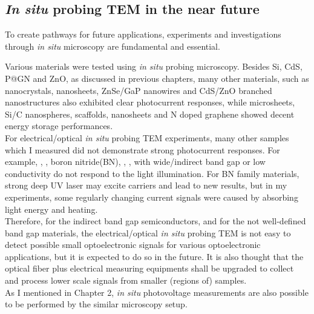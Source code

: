 
\subsection{\textit{In situ} probing TEM in the near future}
To create pathways for future applications, experiments and investigations through \textit{in situ} microscopy are fundamental and essential. 

Various materials were tested using \textit{in situ} probing microscopy. Besides Si, CdS, P@GN and ZnO, as discussed in previous chapters, many other materials, such as  nanocrystals,  nanosheets, ZnSe/GaP nanowires and CdS/ZnO branched nanostructures also exhibited clear photocurrent responses, while  microsheets, Si/C nanospheres,  scaffolds,  nanosheets and N doped graphene showed decent energy storage performances.\\

For electrical/optical \textit{in situ} probing TEM experiments, many other samples which I measured did not demonstrate strong photocurrent responses. For example, , , boron nitride(BN), , ,  with wide/indirect band gap or low conductivity do not respond to the light illumination. For BN family materials, strong deep UV laser may excite carriers and lead to new results, but in my experiments, some regularly changing current signals were caused by absorbing light energy and heating. \\

Therefore, for the indirect band gap semiconductors, and for the not well-defined band gap materials, the electrical/optical \textit{in situ} probing TEM is not easy to detect possible small optoelectronic signals for various optoelectronic applications, but it is expected to do so in the future. It is also thought that the optical fiber plus electrical measuring equipments shall be upgraded to collect and process lower scale signals from smaller (regions of) samples. \\

As I mentioned in Chapter 2, \textit{in situ} photovoltage measurements are also possible to be performed by the similar microscopy setup. 

